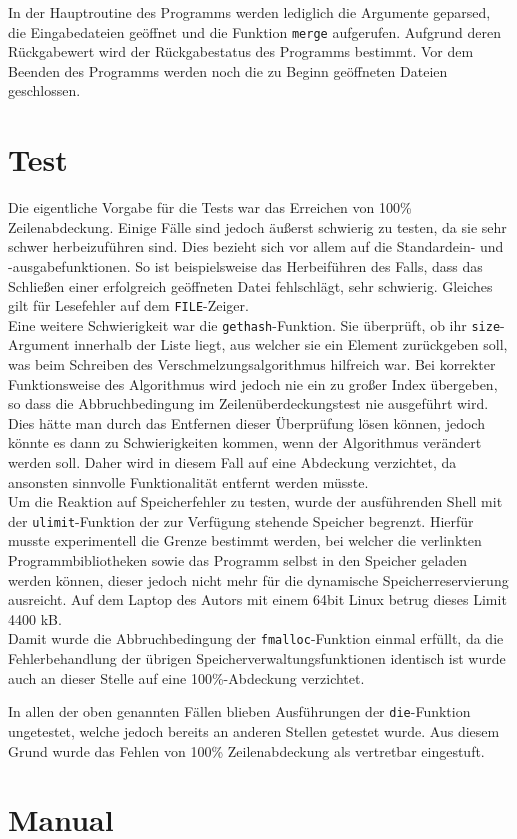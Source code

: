 \documentclass[a4paper,titlepage,12pt]{scrartcl}
\begin{document}
In der Hauptroutine des Programms werden lediglich die Argumente geparsed,
die Eingabedateien geöffnet und die Funktion \texttt{merge} aufgerufen.
Aufgrund deren Rückgabewert wird der Rückgabestatus des Programms bestimmt.
Vor dem Beenden des Programms werden noch die zu Beginn geöffneten Dateien geschlossen.

\section{Test}
\label{sec:test}
Die eigentliche Vorgabe für die Tests war das Erreichen von 100\% Zeilenabdeckung. 
Einige Fälle sind jedoch äußerst schwierig zu testen,
da sie sehr schwer herbeizuführen sind.
Dies bezieht sich vor allem auf die Standardein- und -ausgabefunktionen.
So ist beispielsweise das Herbeiführen des Falls,
dass das Schließen einer erfolgreich geöffneten Datei fehlschlägt,
sehr schwierig.
Gleiches gilt für Lesefehler auf dem \texttt{FILE}-Zeiger.
\\
Eine weitere Schwierigkeit war die \texttt{gethash}-Funktion.
Sie überprüft,
ob ihr \texttt{size}-Argument innerhalb der Liste liegt,
aus welcher sie ein Element zurückgeben soll,
was beim Schreiben des Verschmelzungsalgorithmus hilfreich war.
Bei korrekter Funktionsweise des Algorithmus wird jedoch nie ein zu großer Index übergeben,
so dass die Abbruchbedingung im Zeilenüberdeckungstest nie ausgeführt wird.
Dies hätte man durch das Entfernen dieser Überprüfung lösen können,
jedoch könnte es dann zu Schwierigkeiten kommen,
wenn der Algorithmus verändert werden soll.
Daher wird in diesem Fall auf eine Abdeckung verzichtet,
da ansonsten sinnvolle Funktionalität entfernt werden müsste.
\\
Um die Reaktion auf Speicherfehler zu testen,
wurde der ausführenden Shell mit der \texttt{ulimit}-Funktion der zur Verfügung stehende Speicher begrenzt.
Hierfür musste experimentell die Grenze bestimmt werden,
bei welcher die verlinkten Programmbibliotheken sowie das Programm selbst in den Speicher geladen werden können,
dieser jedoch nicht mehr für die dynamische Speicherreservierung ausreicht.
Auf dem Laptop des Autors mit einem 64bit Linux betrug dieses Limit 4400 kB.
\\
Damit wurde die Abbruchbedingung der \texttt{fmalloc}-Funktion einmal erfüllt,
da die Fehlerbehandlung der übrigen Speicherverwaltungsfunktionen identisch ist wurde auch an dieser Stelle auf eine 100\%-Abdeckung verzichtet.

In allen der oben genannten Fällen blieben Ausführungen der \texttt{die}-Funktion ungetestet,
welche jedoch bereits an anderen Stellen getestet wurde.
Aus diesem Grund wurde das Fehlen von 100\% Zeilenabdeckung als vertretbar eingestuft.

\clearpage
\appendix

\section{Manual}
\label{apx:man}




\end{document}
